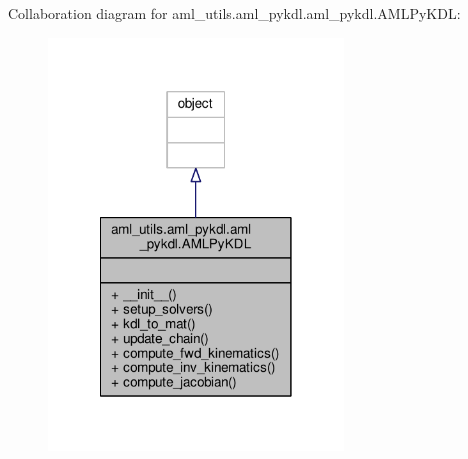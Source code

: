 Collaboration diagram for aml\-\_\-utils.\-aml\-\_\-pykdl.\-aml\-\_\-pykdl.\-A\-M\-L\-Py\-K\-D\-L\-:
\nopagebreak
\begin{figure}[H]
\begin{center}
\leavevmode
\includegraphics[width=222pt]{classaml__utils_1_1aml__pykdl_1_1aml__pykdl_1_1_a_m_l_py_k_d_l__coll__graph}
\end{center}
\end{figure}
